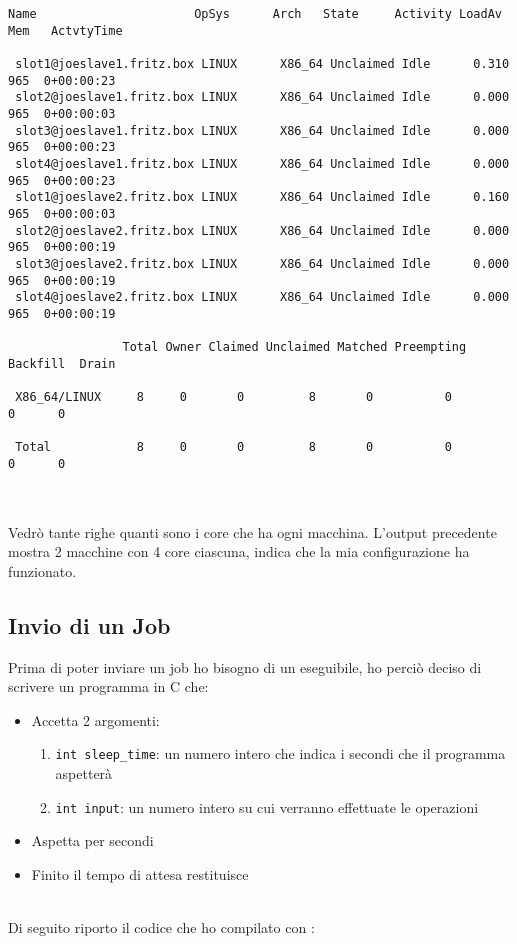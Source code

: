 \begin{lstlisting}[style=output_tiny]
 Name                      OpSys      Arch   State     Activity LoadAv Mem   ActvtyTime
 
 slot1@joeslave1.fritz.box LINUX      X86_64 Unclaimed Idle      0.310  965  0+00:00:23
 slot2@joeslave1.fritz.box LINUX      X86_64 Unclaimed Idle      0.000  965  0+00:00:03
 slot3@joeslave1.fritz.box LINUX      X86_64 Unclaimed Idle      0.000  965  0+00:00:23
 slot4@joeslave1.fritz.box LINUX      X86_64 Unclaimed Idle      0.000  965  0+00:00:23
 slot1@joeslave2.fritz.box LINUX      X86_64 Unclaimed Idle      0.160  965  0+00:00:03
 slot2@joeslave2.fritz.box LINUX      X86_64 Unclaimed Idle      0.000  965  0+00:00:19
 slot3@joeslave2.fritz.box LINUX      X86_64 Unclaimed Idle      0.000  965  0+00:00:19
 slot4@joeslave2.fritz.box LINUX      X86_64 Unclaimed Idle      0.000  965  0+00:00:19
 
                Total Owner Claimed Unclaimed Matched Preempting Backfill  Drain
 
 X86_64/LINUX     8     0       0         8       0          0        0      0
 
 Total            8     0       0         8       0          0        0      0
 
\end{lstlisting}
\ \\
Vedr\`{o} tante righe quanti sono i core che ha ogni macchina. L'output precedente mostra 2 macchine con 4 core ciascuna, indica che la mia configurazione ha funzionato.
\pagebreak
\subsection{Invio di un Job}

Prima di poter inviare un job ho bisogno di un eseguibile, ho perci\`{o} deciso di scrivere un programma in C che: 

\begin{itemize}
	\item Accetta 2 argomenti:
	\begin{enumerate}
		\item \lstinline[style=c]|int sleep_time|: un numero intero che indica i secondi che il programma aspetter\`{a}
		\item \lstinline[style=c]|int input|: un numero intero su cui verranno effettuate le operazioni
	\end{enumerate}
	\item Aspetta per  secondi
	\item Finito il tempo di attesa restituisce 
\end{itemize}
\ \\
Di seguito riporto il codice che ho compilato con :

